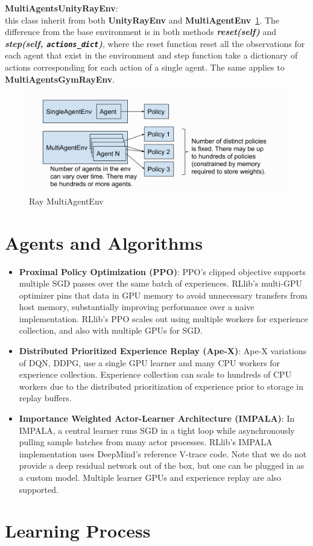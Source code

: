 \textbf{MultiAgentsUnityRayEnv}:\\
this class inherit from both \colorbox{gray!20}{\textbf{UnityRayEnv}} and \colorbox{gray!20}{\textbf{MultiAgentEnv}}~\ref{fig:ray_multiagentenv}. The difference from the base environment is in both methods \textit{\textbf{\colorbox{gray!20}{reset(self)}}} and \textit{\textbf{\colorbox{gray!20}{step(self, \texttt{actions\_dict})}}}, where the reset function reset all the observations for each agent that exist in the environment and step function take a dictionary of actions corresponding for each action of a single agent. The same applies to \textbf{MultiAgentsGymRayEnv}.

\begin{figure}[!htb]
	\centering
		\includegraphics[width=\linewidth]{figures/architecture/ray_multiagentenv.png}
		\caption{Ray MultiAgentEnv}
		\label{fig:ray_multiagentenv}
\end{figure}

\section{Agents and Algorithms}

\begin{itemize}
    \item \textbf{Proximal Policy Optimization (PPO)}: PPO’s clipped objective supports multiple SGD passes over the same batch of experiences. RLlib’s multi-GPU optimizer pins that data in GPU memory to avoid unnecessary transfers from host memory, substantially improving performance over a naive implementation. RLlib’s PPO scales out using multiple workers for experience collection, and also with multiple GPUs for SGD.

    \item \textbf{Distributed Prioritized Experience Replay (Ape-X)}: Ape-X variations of DQN, DDPG, use a single GPU learner and many CPU workers for experience collection. Experience collection can scale to hundreds of CPU workers due to the distributed prioritization of experience prior to storage in replay buffers.

    \item \textbf{Importance Weighted Actor-Learner Architecture (IMPALA)}: In IMPALA, a central learner runs SGD in a tight loop while asynchronously pulling sample batches from many actor processes. RLlib’s IMPALA implementation uses DeepMind’s reference V-trace code. Note that we do not provide a deep residual network out of the box, but one can be plugged in as a custom model. Multiple learner GPUs and experience replay are also supported.
\end{itemize}

\section{Learning Process}